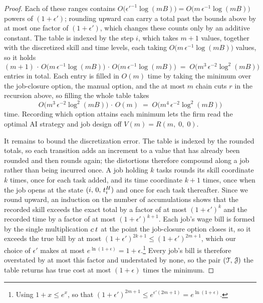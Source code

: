\begin{proof}
Each of these ranges contains $O\bigl(\epsilon'^{-1}\log(mB)\bigr) = O\bigl(m\,\epsilon^{-1}\log(mB)\bigr)$ powers of $(1+\epsilon')$; rounding upward can carry a total past the bounds above by at most one factor of $(1+\epsilon')$, which changes these counts only by an additive constant.
The table is indexed by the step $i$, which takes $m+1$ values, together with the discretized skill and time levels, each taking $O\bigl(m\,\epsilon^{-1}\log(mB)\bigr)$ values, so it holds
\[
(m+1)\,\cdot\,O\bigl(m\,\epsilon^{-1}\log(mB)\bigr)\,\cdot\,O\bigl(m\,\epsilon^{-1}\log(mB)\bigr) \;=\; O\bigl(m^3\,\epsilon^{-2}\log^2(mB)\bigr)
\]
entries in total.
Each entry is filled in $O(m)$ time by taking the minimum over the job-closure option, the manual option, and the at most $m$ chain cuts $r$ in the recursion above, so filling the whole table takes
\[
O\bigl(m^3\,\epsilon^{-2}\log^2(mB)\bigr)\,\cdot\,O(m) \;=\; O\bigl(m^4\,\epsilon^{-2}\log^2(mB)\bigr)
\]
time.
Recording which option attains each minimum lets the firm read the optimal AI strategy and job design off $V(m) = R(m,\; 0,\; 0)$.

It remains to bound the discretization error.
The table is indexed by the rounded totals, so each transition adds an increment to a value that has already been rounded and then rounds again; the distortions therefore compound along a job rather than being incurred once.
A job holding $k$ tasks rounds its skill coordinate $k$ times, once for each task added, and its time coordinate $k+1$ times, once when the job opens at the state $(i,\, 0,\, t^{H}_{i})$ and once for each task thereafter.
Since we round upward, an induction on the number of accumulations shows that the recorded skill exceeds the exact total by a factor of at most $(1+\epsilon')^{k}$ and the recorded time by a factor of at most $(1+\epsilon')^{k+1}$.
Each job's wage bill is formed by the single multiplication $c_{}\,t_{}$ at the point the job-closure option closes it, so it exceeds the true bill by at most $(1+\epsilon')^{2k+1} \leq (1+\epsilon')^{2m+1}$, which our choice of $\epsilon'$ makes at most $e^{\ln(1+\epsilon)} = 1+\epsilon$.\footnote{Using $1+x \leq e^{x}$, so that $(1+\epsilon')^{2m+1} \leq e^{\epsilon'(2m+1)} = e^{\ln(1+\epsilon)}$.}
Every job's bill is therefore overstated by at most this factor and understated by none, so the pair $(\mathcal{T},\, \mathcal{J})$ the table returns has true cost at most $(1+\epsilon)$ times the minimum.
\end{proof}

